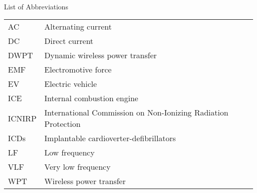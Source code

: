 

\renewcommand{\baselinestretch}{1}
\small\normalsize
\hbox{\ }

\vspace{.5in}

\begin{center}
\large{List of Abbreviations}
\end{center} 

\vspace{3pt}

\begin{supertabular}{ll}
AC & Alternating current \\
DC & Direct current \\
DWPT & Dynamic wireless power transfer \\
EMF & Electromotive force \\
EV & Electric vehicle \\
ICE & Internal combustion engine \\
ICNIRP & International Commission on Non-Ionizing Radiation Protection \\
ICDs & Implantable cardioverter-defibrillators \\
LF & Low frequency \\
VLF & Very low frequency \\
WPT & Wireless power transfer \\
\end{supertabular}
